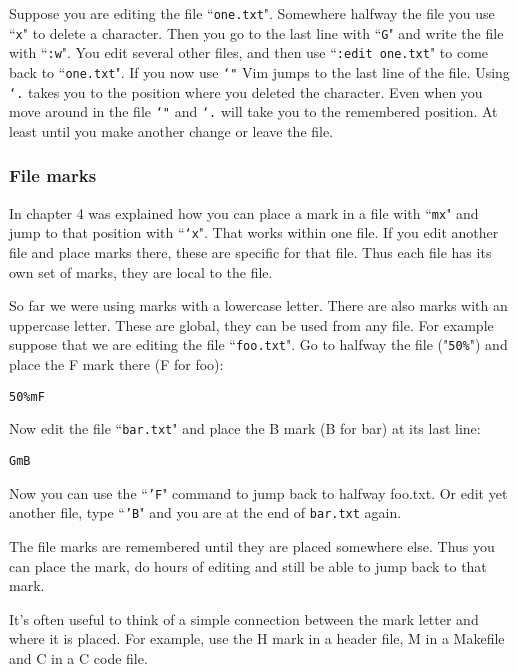 Suppose you are editing the file ``\texttt{one.txt}".
Somewhere halfway the file you use ``\texttt{x}" to delete a character.
Then you go to the last line with ``\texttt{G}" and write the file with ``\texttt{:w}".
You edit several other files, and then use ``\texttt{:edit one.txt}" to come back to ``\texttt{one.txt}".
If you now use \texttt{`"} Vim jumps to the last line of the file.
Using \texttt{`.} takes you to the position where you deleted the character.
Even when you move around in the file \texttt{`"} and \texttt{`.} will take you to the remembered position.
At least until you make another change or leave the file.

\subsubsection{File marks}
In chapter 4 was explained how you can place a mark in a file with ``\texttt{mx}" and jump to that position with ``\texttt{`x}".
That works within one file.
If you edit another file and place marks there, these are specific for that file.
Thus each file has its own set of marks, they are local to the file.

So far we were using marks with a lowercase letter.  There are also marks
with an uppercase letter.  These are global, they can be used from any file.
For example suppose that we are editing the file ``\texttt{foo.txt}".  Go to halfway the
file ("\texttt{50\%}") and place the F mark there (F for foo):

 \begin{Verbatim}[samepage=true]
 50%mF
 \end{Verbatim}

Now edit the file ``\texttt{bar.txt}" and place the B mark (B for bar) at its last line:

 \begin{Verbatim}[samepage=true]
 GmB
 \end{Verbatim}

Now you can use the ``\texttt{'F}" command to jump back to halfway foo.txt.
Or edit yet another file, type ``\texttt{'B}" and you are at the end of \texttt{bar.txt} again.

The file marks are remembered until they are placed somewhere else.
Thus you can place the mark, do hours of editing and still be able to jump back to that mark.

It's often useful to think of a simple connection between the mark letter and where it is placed.
For example, use the H mark in a header file, M in a Makefile and C in a C code file.

